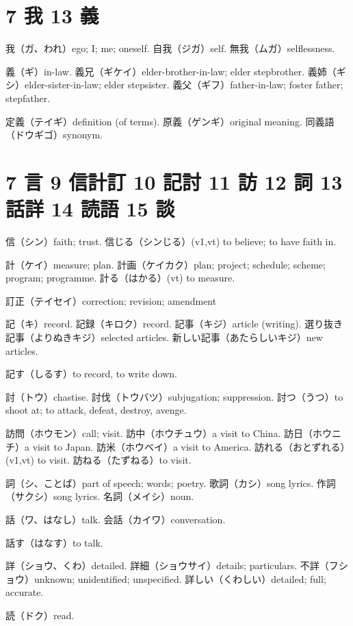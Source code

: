 \section{7 我 13 義}

我（ガ、われ）ego; I; me; oneself.
自我（ジガ）self.
無我（ムガ）selflessness.

義（ギ）in-law.
義兄（ギケイ）elder-brother-in-law; elder stepbrother.
義姉（ギシ）elder-sister-in-law; elder stepsister.
義父（ギフ）father-in-law; foster father; stepfather.

定義（テイギ）definition (of terms).
原義（ゲンギ）original meaning.
同義語（ドウギゴ）synonym.

\section{7 言 9 信計訂 10 記討 11 訪 12 詞 13 話詳 14 読語 15 談}

信（シン）faith; trust.
信じる（シンじる）(v1,vt) to believe; to have faith in.

計（ケイ）measure; plan.
計画（ケイカク）plan; project; schedule; scheme; program; programme.
計る（はかる）(vt) to measure.

訂正（テイセイ）correction; revision; amendment

記（キ）record.
記録（キロク）record.
記事（キジ）article (writing).
選り抜き記事（よりぬきキジ）selected articles.
新しい記事（あたらしいキジ）new articles.

記す（しるす）to record, to write down.

討（トウ）chastise.
討伐（トウバツ）subjugation; suppression.
討つ（うつ）to shoot at; to attack, defeat, destroy, avenge.

訪問（ホウモン）call; visit.
訪中（ホウチュウ）a visit to China.
訪日（ホウニチ）a visit to Japan.
訪米（ホウベイ）a visit to America.
訪れる（おとずれる）(v1,vt) to visit.
訪ねる（たずねる）to visit.

詞（シ、ことば）part of speech; words; poetry.
歌詞（カシ）song lyrics.
作詞（サクシ）song lyrics.
名詞（メイシ）noun.

話（ワ、はなし）talk.
会話（カイワ）conversation.

話す（はなす）to talk.

詳（ショウ、くわ）detailed.
詳細（ショウサイ）details; particulars.
不詳（フショウ）unknown; unidentified; unspecified.
詳しい（くわしい）detailed; full; accurate.

読（ドク）read.

